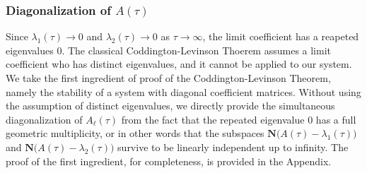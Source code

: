 \documentclass[a4paper,11pt]{article}
\theoremstyle{remark}
\begin{document}
{\subsubsection{Diagonalization of $A(\tau)$}
Since $\lambda_1(\tau) \rightarrow 0$ and $\lambda_2(\tau) \rightarrow 0$ as $\tau \rightarrow \infty$, the limit coefficient has a reapeted eigenvalues $0$. The classical Coddington-Levinson Thoerem assumes a limit coefficient who has distinct eigenvalues, and it cannot be applied to our system. We take the first ingredient of proof of the Coddington-Levinson Theorem, namely the stability of a system with diagonal coefficient matrices. Without using the assumption of distinct eigenvalues, we directly provide the simultaneous diagonalization of $A_\ell(\tau)$ from the fact that the repeated eigenvalue $0$ has a full geometric multiplicity, or in other words that the subspaces $\mathbf{N}\Big(A(\tau)-\lambda_1(\tau)\Big)$ and  $\mathbf{N}\Big(A(\tau)-\lambda_2(\tau)\Big)$ survive to be linearly independent up to infinity. The proof of the first ingredient, for completeness, is provided in the Appendix.

}
\end{document}
